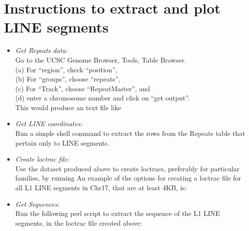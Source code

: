 \documentclass[11pt]{article}
\begin{document}
\section{Instructions to extract and plot LINE segments}
\begin{itemize}
\item 
\emph{Get Repeats data:} \\ 
Go to the UCSC Genome Browser, Tools, Table Browser. \\
(a) For ``region'', check ``position'', \\
(b) For ``groups'', choose ``repeats'', \\
(c) For ``Track'', choose ``RepeatMaster'', and \\
(d) enter a chromosome number and click on ``get output''. \\ 
This would produce an text file like 
\item
\emph{Get LINE coordinates:} \\ 
Run a simple shell command to extract the rows from the Repeats table that pertain only to LINE segments.
\item
\emph{Create loctrac file:} \\ 
Use the dataset produced above to create loctracs, preferably for particular families, by running 
An example of the options for creating a loctrac file for all L1 LINE segments in Chr17, that are at least 4KB, is:
\item
\emph{Get Sequences:} \\ 
Run the following perl script to extract the sequence of the L1 LINE segments, in the loctrac file created above:

\end{itemize}
\end{document}
